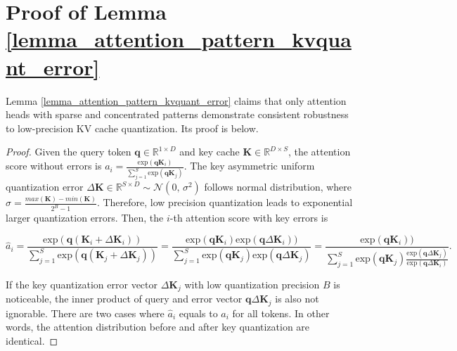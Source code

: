 \appendix
\onecolumn
\section{Proof of Lemma \ref{lemma_attention_pattern_kvquant_error}}
\label{sec:proof_of_lemma_kvquant_error_attention_patterns}
Lemma \ref{lemma_attention_pattern_kvquant_error} claims that only attention heads with sparse and concentrated patterns demonstrate consistent robustness to low-precision KV cache quantization. Its proof is below.
\begin{proof}
Given the query token $\boldsymbol{q} \in \mathbb{R}^{1  \times D}$ and key cache $\boldsymbol{K} \in \mathbb{R}^{D \times S}$, the attention score without errors is $a_i = \frac{\mbox{exp}(\boldsymbol{q} \boldsymbol{K}_i)}{\sum_{j=1}^{S} \mbox{exp}(\boldsymbol{q} \boldsymbol{K}_j)}$. The key asymmetric uniform quantization error $\Delta \boldsymbol{K} \in \mathbb{R}^{S \times D} \sim \mathcal{N}(0, \,\sigma^{2}) $ follows normal distribution, where $\sigma = \frac{max(\boldsymbol{K})-min(\boldsymbol{K})}{2^B-1}$. Therefore, low precision quantization leads to exponential larger quantization errors. Then, the $i$-th attention score with key errors is 

\begin{equation}
\hat{a}_i = \frac{\mbox{exp}(\boldsymbol{q} (\boldsymbol{K}_i + \Delta \boldsymbol{K}_i))}{\sum_{j=1}^{S} \mbox{exp}(\boldsymbol{q} (\boldsymbol{K}_j + \Delta \boldsymbol{K}_j))} 
= \frac{\mbox{exp}(\boldsymbol{q} \boldsymbol{K}_i) \mbox{exp}(\boldsymbol{q} \Delta \boldsymbol{K}_i))}{\sum_{j=1}^{S} \mbox{exp}(\boldsymbol{q} \boldsymbol{K}_j) \mbox{exp}(\boldsymbol{q} \Delta \boldsymbol{K}_j)}
= \frac{ \mbox{exp}(\boldsymbol{q} \boldsymbol{K}_i))}{\sum_{j=1}^{S} \mbox{exp}(\boldsymbol{q} \boldsymbol{K}_j)  \frac{\mbox{exp}(\boldsymbol{q} \Delta \boldsymbol{K}_j)}{\mbox{exp}(\boldsymbol{q} \Delta \boldsymbol{K}_i)} }.
\end{equation}

If the key quantization error vector $\Delta \boldsymbol{K}_j$ with low quantization 
precision $B$ is noticeable, the inner product of query and error vector $\boldsymbol{q} \Delta \boldsymbol{K}_j$ is also not ignorable. There are two cases where $\hat{a}_i$ equals to $a_i$ for all tokens. In other words, the attention distribution before and after key quantization are identical.


\end{proof}
